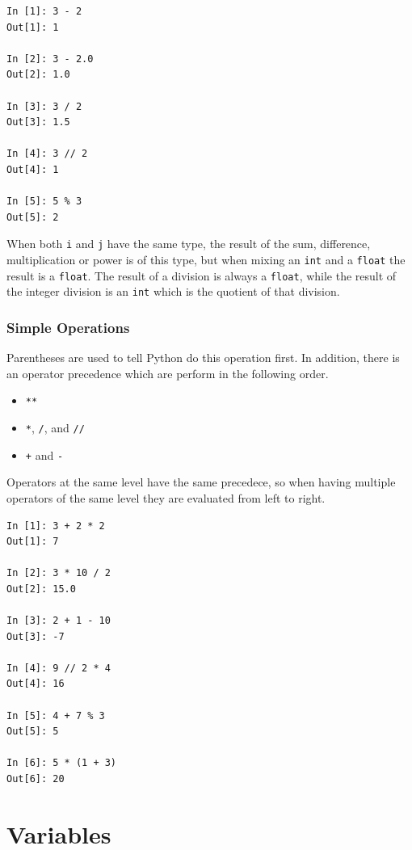 \documentclass[a4paper]{article}
\newcommand{\inlinecode}{\texttt}
\begin{document}
\begin{lstlisting}
In [1]: 3 - 2
Out[1]: 1

In [2]: 3 - 2.0
Out[2]: 1.0

In [3]: 3 / 2
Out[3]: 1.5

In [4]: 3 // 2
Out[4]: 1

In [5]: 5 % 3
Out[5]: 2
\end{lstlisting}

When both \inlinecode{i} and \inlinecode{j} have the same type, the result of
the sum, difference, multiplication or power is of this type, but when mixing
an \inlinecode{int} and a \inlinecode{float} the result is a
\inlinecode{float}. The result of a division is always a \inlinecode{float},
while the result of the integer division is an \inlinecode{int} which is the
quotient of that division.

\subsubsection{Simple Operations}

Parentheses are used to tell Python do this operation first. In addition,
there is an operator precedence which are perform in the following order.

\begin{itemize}
  \item \inlinecode{**}
  \item \inlinecode{*},  \inlinecode{/}, and \inlinecode{//}
  \item \inlinecode{+} and \inlinecode{-}
\end{itemize}

Operators at the same level have the same precedece, so when having multiple
operators of the same level they are evaluated from left to right.

\begin{lstlisting}
In [1]: 3 + 2 * 2
Out[1]: 7

In [2]: 3 * 10 / 2
Out[2]: 15.0

In [3]: 2 + 1 - 10
Out[3]: -7

In [4]: 9 // 2 * 4
Out[4]: 16

In [5]: 4 + 7 % 3
Out[5]: 5

In [6]: 5 * (1 + 3)
Out[6]: 20
\end{lstlisting}

\section{Variables}
\end{document}
